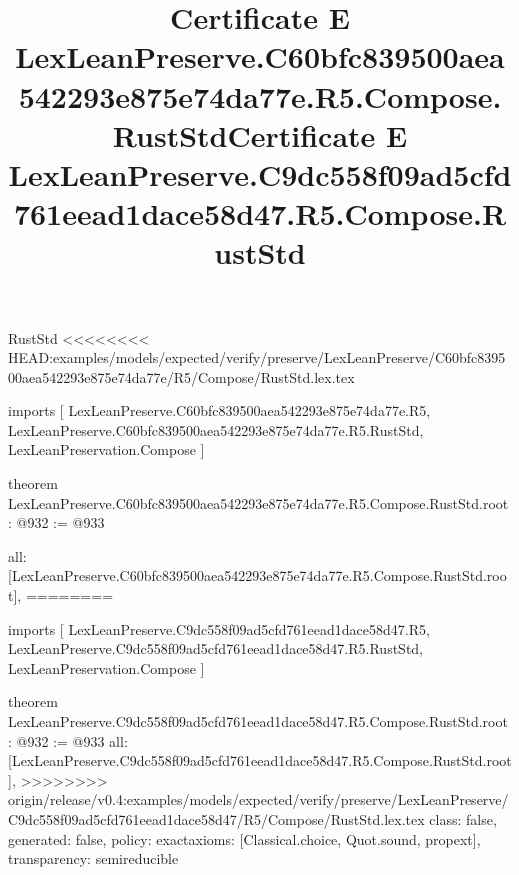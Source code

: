 \begin{lexlean}{RustStd}
<<<<<<<< HEAD:examples/models/expected/verify/preserve/LexLeanPreserve/C60bfc839500aea542293e875e74da77e/R5/Compose/RustStd.lex.tex
\title{Certificate E LexLeanPreserve.C60bfc839500aea542293e875e74da77e.R5.Compose.RustStd}
\begin{coremodule}
imports [
  LexLeanPreserve.C60bfc839500aea542293e875e74da77e.R5,
  LexLeanPreserve.C60bfc839500aea542293e875e74da77e.R5.RustStd,
  LexLeanPreservation.Compose
]

theorem LexLeanPreserve.C60bfc839500aea542293e875e74da77e.R5.Compose.RustStd.root : @932 := @933 {
  all: [LexLeanPreserve.C60bfc839500aea542293e875e74da77e.R5.Compose.RustStd.root],
========
\title{Certificate E LexLeanPreserve.C9dc558f09ad5cfd761eead1dace58d47.R5.Compose.RustStd}
\begin{coremodule}
imports [
  LexLeanPreserve.C9dc558f09ad5cfd761eead1dace58d47.R5,
  LexLeanPreserve.C9dc558f09ad5cfd761eead1dace58d47.R5.RustStd,
  LexLeanPreservation.Compose
]

theorem LexLeanPreserve.C9dc558f09ad5cfd761eead1dace58d47.R5.Compose.RustStd.root : @932 := @933 {
  all: [LexLeanPreserve.C9dc558f09ad5cfd761eead1dace58d47.R5.Compose.RustStd.root],
>>>>>>>> origin/release/v0.4:examples/models/expected/verify/preserve/LexLeanPreserve/C9dc558f09ad5cfd761eead1dace58d47/R5/Compose/RustStd.lex.tex
  class: false,
  generated: false,
  policy: exact{axioms: [Classical.choice, Quot.sound, propext]},
  transparency: semireducible
}


\end{coremodule}}
\end{coremodule}
\end{lexlean}
